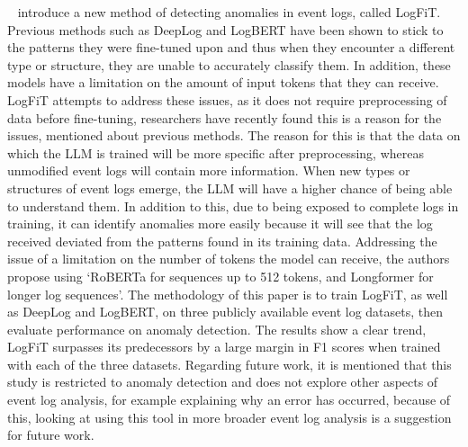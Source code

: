 ~\cite{10414427} introduce a new method of detecting anomalies in event logs, called LogFiT. Previous methods such as DeepLog and LogBERT have been shown to stick to the patterns they were fine-tuned upon and thus when they encounter a different type or structure, they are unable to accurately classify them. In addition, these models have a limitation on the amount of input tokens that they can receive. LogFiT attempts to address these issues, as it does not require preprocessing of data before fine-tuning, researchers have recently found this is a reason for the issues, mentioned about previous methods. The reason for this is that the data on which the LLM is trained will be more specific after preprocessing, whereas unmodified event logs will contain more information. When new types or structures of event logs emerge, the LLM will have a higher chance of being able to understand them. In addition to this, due to being exposed to complete logs in training, it can identify anomalies more easily because it will see that the log received deviated from the patterns found in its training data. Addressing the issue of a limitation on the number of tokens the model can receive, the authors propose using `RoBERTa for sequences up to 512 tokens, and Longformer for longer log sequences'. The methodology of this paper is to train LogFiT, as well as DeepLog and LogBERT, on three publicly available event log datasets, then evaluate performance on anomaly detection. The results show a clear trend, LogFiT surpasses its predecessors by a large margin in F1 scores when trained with each of the three datasets. Regarding future work, it is mentioned that this study is restricted to anomaly detection and does not explore other aspects of event log analysis, for example explaining why an error has occurred, because of this, looking at using this tool in more broader event log analysis is a suggestion for future work. 

